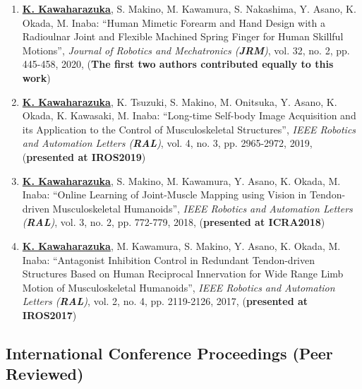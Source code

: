 \documentclass[letterpaper,11pt]{article}
\begin{document}
\begin{enumerate}
\item \underline{\textbf{K. Kawaharazuka}}, S. Makino, M. Kawamura, S. Nakashima, Y. Asano, K. Okada, M. Inaba: ``Human Mimetic Forearm and Hand Design with a Radioulnar Joint and Flexible Machined Spring Finger for Human Skillful Motions'', \textit{Journal of Robotics and Mechatronics (\textit{\textbf{JRM}})}, vol. 32, no. 2, pp. 445-458, 2020, (\textbf{The first two authors contributed equally to this work})
\item \underline{\textbf{K. Kawaharazuka}}, K. Tsuzuki, S. Makino, M. Onitsuka, Y. Asano, K. Okada, K. Kawasaki, M. Inaba: ``Long-time Self-body Image Acquisition and its Application to the Control of Musculoskeletal Structures'', \textit{IEEE Robotics and Automation Letters (\textit{\textbf{RAL}})}, vol. 4, no. 3, pp. 2965-2972, 2019, (\textbf{presented at IROS2019})
\item \underline{\textbf{K. Kawaharazuka}}, S. Makino, M. Kawamura, Y. Asano, K. Okada, M. Inaba: ``Online Learning of Joint-Muscle Mapping using Vision in Tendon-driven Musculoskeletal Humanoids'', \textit{IEEE Robotics and Automation Letters (\textit{\textbf{RAL}})}, vol. 3, no. 2, pp. 772-779, 2018, (\textbf{presented at ICRA2018})
\item \underline{\textbf{K. Kawaharazuka}}, M. Kawamura, S. Makino, Y. Asano, K. Okada, M. Inaba: ``Antagonist Inhibition Control in Redundant Tendon-driven Structures Based on Human Reciprocal Innervation for Wide Range Limb Motion of Musculoskeletal Humanoids'', \textit{IEEE Robotics and Automation Letters (\textit{\textbf{RAL}})}, vol. 2, no. 4, pp. 2119-2126, 2017, (\textbf{presented at IROS2017})
\end{enumerate}

\subsection*{International Conference Proceedings (Peer Reviewed)}
\end{document}
